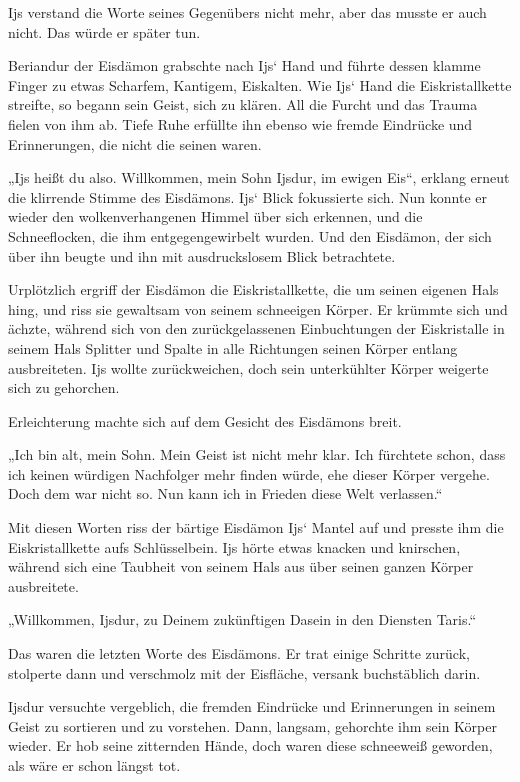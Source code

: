 Ijs verstand die Worte seines Gegenübers nicht mehr, aber das musste er auch nicht. Das würde er später tun.

Beriandur der Eisdämon grabschte nach Ijs‘ Hand und führte dessen klamme Finger zu etwas Scharfem, Kantigem, Eiskalten. Wie Ijs‘ Hand die Eiskristallkette streifte, so begann sein Geist, sich zu klären. All die Furcht und das Trauma fielen von ihm ab. Tiefe Ruhe erfüllte ihn ebenso wie fremde Eindrücke und Erinnerungen, die nicht die seinen waren.

„Ijs heißt du also. Willkommen, mein Sohn Ijsdur, im ewigen Eis“, erklang erneut die klirrende Stimme des Eisdämons. Ijs‘ Blick fokussierte sich. Nun konnte er wieder den wolkenverhangenen Himmel über sich erkennen, und die Schneeflocken, die ihm entgegengewirbelt wurden. Und den Eisdämon, der sich über ihn beugte und ihn mit ausdruckslosem Blick betrachtete.

Urplötzlich ergriff der Eisdämon die Eiskristallkette, die um seinen eigenen Hals hing, und riss sie gewaltsam von seinem schneeigen Körper. Er krümmte sich und ächzte, während sich von den zurückgelassenen Einbuchtungen der Eiskristalle in seinem Hals Splitter und Spalte in alle Richtungen seinen Körper entlang ausbreiteten. Ijs wollte zurückweichen, doch sein unterkühlter Körper weigerte sich zu gehorchen.

Erleichterung machte sich auf dem Gesicht des Eisdämons breit.

„Ich bin alt, mein Sohn. Mein Geist ist nicht mehr klar. Ich fürchtete schon, dass ich keinen würdigen Nachfolger mehr finden würde, ehe dieser Körper vergehe. Doch dem war nicht so. Nun kann ich in Frieden diese Welt verlassen.“

Mit diesen Worten riss der bärtige Eisdämon Ijs‘ Mantel auf und presste ihm die Eiskristallkette aufs Schlüsselbein. Ijs hörte etwas knacken und knirschen, während sich eine Taubheit von seinem Hals aus über seinen ganzen Körper ausbreitete.

„Willkommen, Ijsdur, zu Deinem zukünftigen Dasein in den Diensten Taris.“

Das waren die letzten Worte des Eisdämons. Er trat einige Schritte zurück, stolperte dann und verschmolz mit der Eisfläche, versank buchstäblich darin.

Ijsdur versuchte vergeblich, die fremden Eindrücke und Erinnerungen in seinem Geist zu sortieren und zu vorstehen. Dann, langsam, gehorchte ihm sein Körper wieder. Er hob seine zitternden Hände, doch waren diese schneeweiß geworden, als wäre er schon längst tot.

